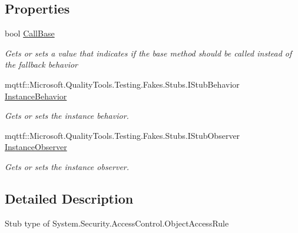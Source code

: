 \subsection*{Properties}
\begin{DoxyCompactItemize}
\item 
bool \hyperlink{class_system_1_1_security_1_1_access_control_1_1_fakes_1_1_stub_object_access_rule_a712998609b0ce244173eedfc3074b44a}{Call\-Base}
\begin{DoxyCompactList}\small\item\em Gets or sets a value that indicates if the base method should be called instead of the fallback behavior\end{DoxyCompactList}\item 
mqttf\-::\-Microsoft.\-Quality\-Tools.\-Testing.\-Fakes.\-Stubs.\-I\-Stub\-Behavior \hyperlink{class_system_1_1_security_1_1_access_control_1_1_fakes_1_1_stub_object_access_rule_a24f75b6b50925bd834c2f107b38d2a2d}{Instance\-Behavior}
\begin{DoxyCompactList}\small\item\em Gets or sets the instance behavior.\end{DoxyCompactList}\item 
mqttf\-::\-Microsoft.\-Quality\-Tools.\-Testing.\-Fakes.\-Stubs.\-I\-Stub\-Observer \hyperlink{class_system_1_1_security_1_1_access_control_1_1_fakes_1_1_stub_object_access_rule_a4d179259819678977a2f7c3e0db381b4}{Instance\-Observer}
\begin{DoxyCompactList}\small\item\em Gets or sets the instance observer.\end{DoxyCompactList}\end{DoxyCompactItemize}


\subsection{Detailed Description}
Stub type of System.\-Security.\-Access\-Control.\-Object\-Access\-Rule



